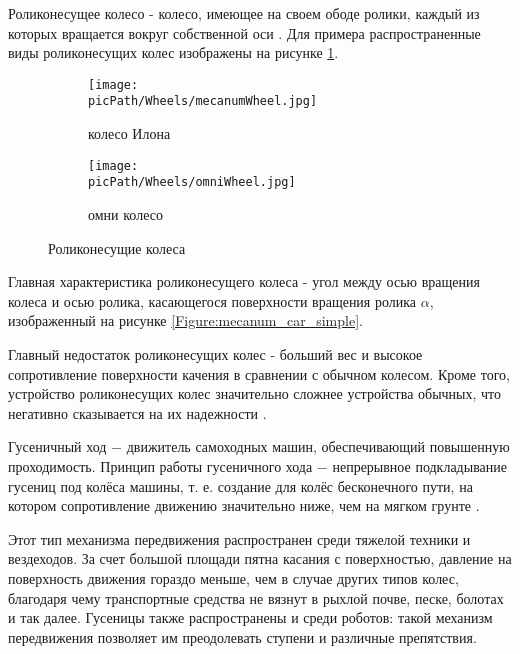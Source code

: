 \documentclass[oneside,final,14pt]{extreport}
\newcommand{\picPath}{img}
\begin{document}
Роликонесущее колесо - колесо, имеющее на своем ободе ролики, каждый из которых вращается вокруг собственной оси \cite{Src:MecanumWheel}. Для примера распространенные виды роликонесущих колес изображены на рисунке \ref{Figure:rollerHandedWheels}.
\begin{figure}[H]
  \centering
  \begin{subfigure}[b]{0.4\linewidth}
   \texttt{[image: \\picPath/Wheels/mecanumWheel.jpg]}
    \caption{ колесо Илона }
  \end{subfigure}
  \begin{subfigure}[b]{0.4\linewidth}
    \texttt{[image: \\picPath/Wheels/omniWheel.jpg]}
    \caption{ омни колесо }
  \end{subfigure}
  \caption{ Роликонесущие колеса}
  \label{Figure:rollerHandedWheels}
\end{figure}
Главная характеристика роликонесущего колеса - угол между осью вращения колеса и  осью ролика, касающегося поверхности вращения ролика $\alpha$, изображенный на рисунке \ref{Figure:mecanum_car_simple}.
\begin{figure}[H]
\end{figure}



Главный недостаток роликонесущих колес - больший вес и высокое сопротивление поверхности качения в сравнении с обычном колесом. Кроме того, устройство роликонесущих колес значительно сложнее устройства обычных, что негативно сказывается на их надежности \cite{Src:WheelCmp}.

Гусеничный ход $-$ движитель самоходных машин, обеспечивающий повышенную проходимость. Принцип работы гусеничного хода $-$ непрерывное подкладывание гусениц под колёса машины, т. е. создание для колёс бесконечного пути, на котором сопротивление движению значительно ниже, чем на мягком грунте \cite{Src:Ozhigov}. 

Этот тип механизма передвижения распространен среди тяжелой техники и вездеходов. За счет большой площади пятна касания с поверхностью, давление на поверхность движения гораздо меньше, чем в случае других типов колес, благодаря чему транспортные средства не вязнут в рыхлой почве, песке, болотах и так далее. Гусеницы также распространены и среди роботов: такой механизм передвижения позволяет им преодолевать ступени и различные препятствия. 
\end{document}
